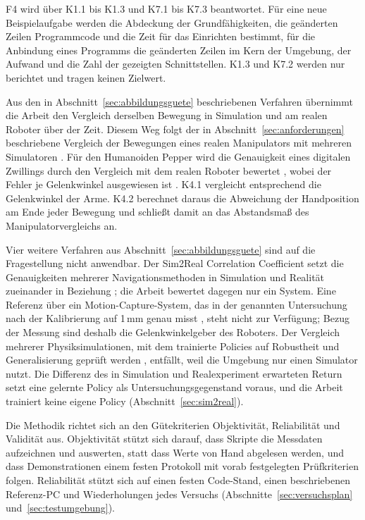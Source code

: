F4 wird über K1.1 bis K1.3 und K7.1 bis K7.3 beantwortet.
Für eine neue Beispielaufgabe werden die Abdeckung der Grundfähigkeiten, die geänderten Zeilen Programmcode und die Zeit für das Einrichten bestimmt, für die Anbindung eines Programms die geänderten Zeilen im Kern der Umgebung, der Aufwand und die Zahl der gezeigten Schnittstellen.
K1.3 und K7.2 werden nur berichtet und tragen keinen Zielwert.

Aus den in Abschnitt~\ref{sec:abbildungsguete} beschriebenen Verfahren übernimmt die Arbeit den Vergleich derselben Bewegung in Simulation und am realen Roboter über der Zeit.
Diesem Weg folgt der in Abschnitt~\ref{sec:anforderungen} beschriebene Vergleich der Bewegungen eines realen Manipulators mit mehreren Simulatoren \cite{Collins2019}.
Für den Humanoiden Pepper wird die Genauigkeit eines digitalen Zwillings durch den Vergleich mit dem realen Roboter bewertet \cite{Sekkat2024}, wobei der Fehler je Gelenkwinkel ausgewiesen ist \cite{Sekkat2024}.
K4.1 vergleicht entsprechend die Gelenkwinkel der Arme.
K4.2 berechnet daraus die Abweichung der Handposition am Ende jeder Bewegung und schließt damit an das Abstandsmaß des Manipulatorvergleichs an.

Vier weitere Verfahren aus Abschnitt~\ref{sec:abbildungsguete} sind auf die Fragestellung nicht anwendbar.
Der Sim2Real Correlation Coefficient setzt die Genauigkeiten mehrerer Navigationsmethoden in Simulation und Realität zueinander in Beziehung \cite{Kadian2020}; die Arbeit bewertet dagegen nur ein System.
Eine Referenz über ein Motion-Capture-System, das in der genannten Untersuchung nach der Kalibrierung auf 1\,mm genau misst \cite{Collins2019}, steht nicht zur Verfügung; Bezug der Messung sind deshalb die Gelenkwinkelgeber des Roboters.
Der Vergleich mehrerer Physiksimulationen, mit dem trainierte Policies auf Robustheit und Generalisierung geprüft werden \cite{Gu2024}, entfällt, weil die Umgebung nur einen Simulator nutzt.
Die Differenz des in Simulation und Realexperiment erwarteten Return \cite{Tan2018} setzt eine gelernte Policy als Untersuchungsgegenstand voraus, und die Arbeit trainiert keine eigene Policy (Abschnitt~\ref{sec:sim2real}).

Die Methodik richtet sich an den Gütekriterien Objektivität, Reliabilität und Validität aus.
Objektivität stützt sich darauf, dass Skripte die Messdaten aufzeichnen und auswerten, statt dass Werte von Hand abgelesen werden, und dass Demonstrationen einem festen Protokoll mit vorab festgelegten Prüfkriterien folgen.
Reliabilität stützt sich auf einen festen Code-Stand, einen beschriebenen Referenz-PC und Wiederholungen jedes Versuchs (Abschnitte~\ref{sec:versuchsplan} und~\ref{sec:testumgebung}).

